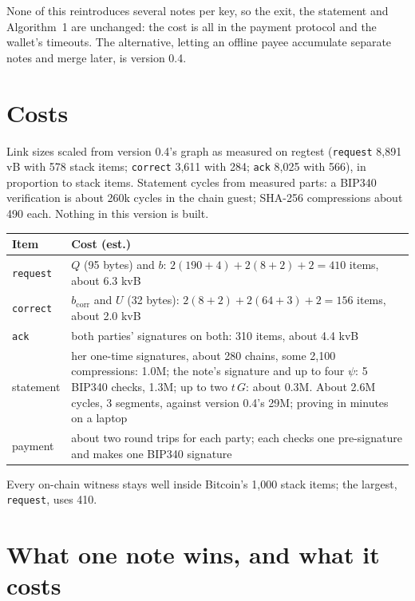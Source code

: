 \documentclass[11pt]{article}
\theoremstyle{plain}
\theoremstyle{definition}
\newcommand{\bcorr}{b_{\mathrm{corr}}}
\newcommand{\tx}[1]{\texttt{#1}}
\begin{document}
None of this reintroduces several notes per key, so the exit, the
statement and Algorithm~1 are unchanged: the cost is all in the
payment protocol and the wallet's timeouts. The alternative, letting an
offline payee accumulate separate notes and merge later, is version
0.4.

\section{Costs}\label{sec:costs}

Link sizes scaled from version 0.4's graph as measured on regtest
(\tx{request} 8,891 vB with 578 stack items; \tx{correct} 3,611 with
284; \tx{ack} 8,025 with 566), in proportion to stack items. Statement
cycles from measured parts: a BIP340 verification is about 260k cycles
in the chain guest; SHA-256 compressions about 490 each. Nothing in
this version is built.

\begin{center}
\begin{tabularx}{\linewidth}{lL}
\toprule
Item & Cost (est.) \\
\midrule
\tx{request} & $Q$ (95 bytes) and $b$: $2(190 + 4) + 2(8 + 2) + 2 = 410$ items, about 6.3 kvB \\
\tx{correct} & $\bcorr$ and $U$ (32 bytes): $2(8 + 2) + 2(64 + 3) + 2 = 156$ items, about 2.0 kvB \\
\tx{ack} & both parties' signatures on both: 310 items, about 4.4 kvB \\
statement & her one-time signatures, about 280 chains, some 2,100 compressions: 1.0M; the note's signature and up to four $\psi$: 5 BIP340 checks, 1.3M; up to two $t\,G$: about 0.3M. About 2.6M cycles, 3 segments, against version 0.4's 29M; proving in minutes on a laptop \\
payment & about two round trips for each party; each checks one pre-signature and makes one BIP340 signature \\
\bottomrule
\end{tabularx}
\end{center}

Every on-chain witness stays well inside Bitcoin's 1,000 stack items;
the largest, \tx{request}, uses 410.

\section{What one note wins, and what it costs}\label{sec:compare}
\end{document}
